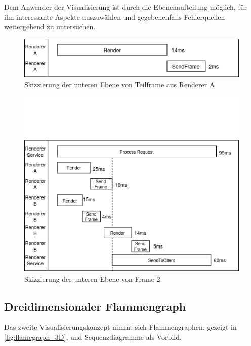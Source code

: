 Dem Anwender der Visualisierung ist durch die Ebenenaufteilung möglich, für ihn interessante Aspekte auszuwählen und gegebenenfalls Fehlerquellen weitergehend zu untersuchen.

\begin{figure}[!ht]
	\centering
	\includegraphics[scale=0.8]{img/Design/FrameGalerieUntereEbene2.png}
	\caption[Untere Ebene der Frame Galerie: Beispiel 2]{ Skizzierung der unteren Ebene von Teilframe aus Renderer A}
	\label{fig:FrameGalerieUntereEbene1}
\end{figure}
\begin{figure}[!ht]
	\centering
	\includegraphics[scale=0.8]{img/Design/FrameGalerieUntereEbene1.png}
	\caption[Untere Ebene der Frame Galerie: Beispiel 1]{ Skizzierung der unteren Ebene von Frame 2}
	\label{fig:FrameGalerieUntereEbene2}
\end{figure}

\subsection{Dreidimensionaler Flammengraph}
\label{subsection:Dreidimensionale Flammengraphen}

Das zweite Visualisierungskonzept nimmt sich Flammengraphen, gezeigt in \cref{fig:flamegraph_3D}, und Sequenzdiagramme als Vorbild.

